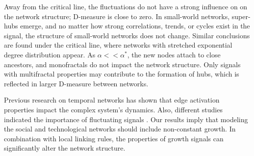 Away from the critical line, the fluctuations do not have a strong influence on %
on the network structure; D-measure is close to zero. In small-world networks, super-hubs emerge, and no matter how strong correlations, trends, or cycles exist in the signal, the structure of small-world networks does not change. Similar conclusions are found under the critical line, where networks with stretched exponential degree distribution appear. As $\alpha<<\alpha^{*}$, the new nodes attach to close ancestors, and monofractals do not impact the network structure. Only signals with multifractal properties may contribute to the formation of hubs, which is reflected in larger D-measure between networks. 

Previous research on temporal networks \cite{holme2012} has shown that edge activation properties impact the complex system's dynamics. Also, different studies indicated the importance of fluctuating signals \cite{huberman1999, mitrovic2015, liu2019}. %
Our results imply that modeling the social and technological networks should include non-constant growth. In combination with local linking rules, the properties of growth signals can significantly alter the network structure. 




